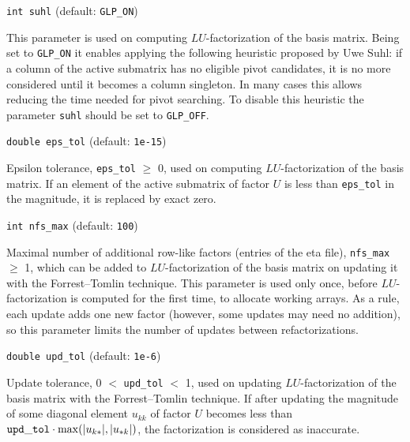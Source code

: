 \newpage

{\tt int suhl} (default: {\tt GLP\_ON})

This parameter is used on computing $LU$-factorization of the basis
matrix. Being set to {\tt GLP\_ON} it enables applying the following
heuristic proposed by Uwe Suhl: if a column of the active submatrix has
no eligible pivot candidates, it is no more considered until it becomes
a column singleton. In many cases this allows reducing the time needed
for pivot searching. To disable this heuristic the parameter
\verb|suhl| should be set to {\tt GLP\_OFF}.

\medskip

{\tt double eps\_tol} (default: {\tt 1e-15})

Epsilon tolerance, \verb|eps_tol| $\geq$ 0, used on computing
$LU$-factorization of the basis matrix. If an element of the active
submatrix of factor $U$ is less than \verb|eps_tol| in the magnitude,
it is replaced by exact zero.

%
%

\medskip

{\tt int nfs\_max} (default: {\tt 100})

Maximal number of additional row-like factors (entries of the eta
file), \verb|nfs_max| $\geq$ 1, which can be added to
$LU$-factorization of the basis matrix on updating it with the
Forrest--Tomlin technique. This parameter is used only once, before
$LU$-factorization is computed for the first time, to allocate working
arrays. As a rule, each update adds one new factor (however, some
updates may need no addition), so this parameter limits the number of
updates between refactorizations.

\medskip

{\tt double upd\_tol} (default: {\tt 1e-6})

Update tolerance, 0 $<$ \verb|upd_tol| $<$ 1, used on updating
$LU$-factorization of the basis matrix with the Forrest--Tomlin
technique. If after updating the magnitude of some diagonal element
$u_{kk}$ of factor $U$ becomes less than
${\tt upd\_tol}\cdot\max(|u_{k*}|, |u_{*k}|)$, the factorization is
considered as inaccurate.

